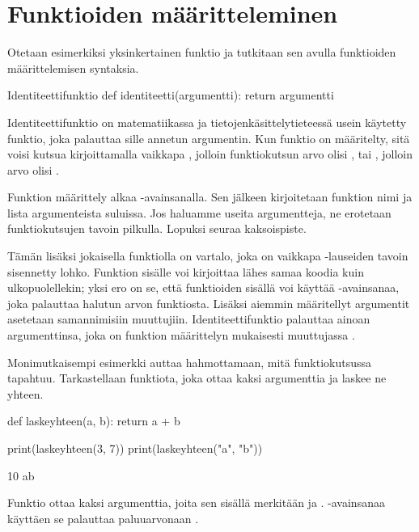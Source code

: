 \section{Funktioiden määritteleminen}

Otetaan esimerkiksi yksinkertainen funktio ja tutkitaan sen avulla funktioiden määrittelemisen syntaksia.

\begin{example}{Identiteettifunktio}
def identiteetti(argumentti):
	return argumentti
\end{example}

Identiteettifunktio on matematiikassa ja tietojenkäsittelytieteessä usein käytetty funktio, joka palauttaa sille annetun argumentin. Kun funktio on määritelty, sitä voisi kutsua kirjoittamalla vaikkapa , jolloin funktiokutsun arvo olisi , tai , jolloin arvo olisi .

Funktion määrittely alkaa -avainsanalla. Sen jälkeen kirjoitetaan funktion nimi ja lista argumenteista suluissa. Jos haluamme useita argumentteja, ne erotetaan funktiokutsujen tavoin pilkulla. Lopuksi seuraa kaksoispiste.

Tämän lisäksi jokaisella funktiolla on vartalo, joka on vaikkapa -lauseiden tavoin sisennetty lohko. Funktion sisälle voi kirjoittaa lähes samaa koodia kuin ulkopuolellekin; yksi ero on se, että funktioiden sisällä voi käyttää -avainsanaa, joka palauttaa halutun arvon funktiosta. Lisäksi aiemmin määritellyt argumentit asetetaan samannimisiin muuttujiin. Identiteettifunktio palauttaa ainoan argumenttinsa, joka on funktion määrittelyn mukaisesti muuttujassa .

Monimutkaisempi esimerkki auttaa hahmottamaan, mitä funktiokutsussa tapahtuu. Tarkastellaan funktiota, joka ottaa kaksi argumenttia ja laskee ne yhteen.

\begin{python}
def laskeyhteen(a, b):
	return a + b

print(laskeyhteen(3, 7))
print(laskeyhteen("a", "b"))
\end{python}

\begin{output}
10
ab
\end{output}

Funktio  ottaa kaksi argumenttia, joita sen sisällä merkitään  ja . -avainsanaa käyttäen se palauttaa paluuarvonaan .

